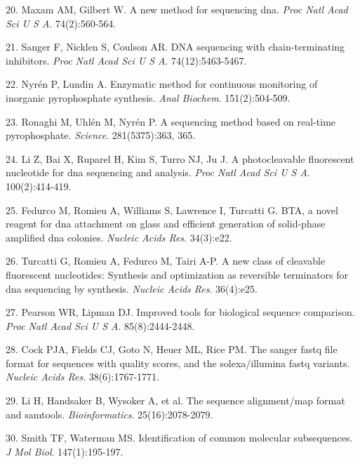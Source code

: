 \documentclass[11pt,letterpaper]{book}
\begin{document}
\leavevmode\hypertarget{ref-maxam:1977aa}{}%
20. Maxam AM, Gilbert W. A new method for sequencing dna. \emph{Proc Natl Acad Sci U S A}. 74(2):560-564.

\leavevmode\hypertarget{ref-sanger:1977aa}{}%
21. Sanger F, Nicklen S, Coulson AR. DNA sequencing with chain-terminating inhibitors. \emph{Proc Natl Acad Sci U S A}. 74(12):5463-5467.

\leavevmode\hypertarget{ref-nyren:1985aa}{}%
22. Nyrén P, Lundin A. Enzymatic method for continuous monitoring of inorganic pyrophosphate synthesis. \emph{Anal Biochem}. 151(2):504-509.

\leavevmode\hypertarget{ref-ronaghi:1998aa}{}%
23. Ronaghi M, Uhlén M, Nyrén P. A sequencing method based on real-time pyrophosphate. \emph{Science}. 281(5375):363, 365.

\leavevmode\hypertarget{ref-li:2003aa}{}%
24. Li Z, Bai X, Ruparel H, Kim S, Turro NJ, Ju J. A photocleavable fluorescent nucleotide for dna sequencing and analysis. \emph{Proc Natl Acad Sci U S A}. 100(2):414-419.

\leavevmode\hypertarget{ref-fedurco:2006aa}{}%
25. Fedurco M, Romieu A, Williams S, Lawrence I, Turcatti G. BTA, a novel reagent for dna attachment on glass and efficient generation of solid-phase amplified dna colonies. \emph{Nucleic Acids Res}. 34(3):e22.

\leavevmode\hypertarget{ref-turcatti:2008aa}{}%
26. Turcatti G, Romieu A, Fedurco M, Tairi A-P. A new class of cleavable fluorescent nucleotides: Synthesis and optimization as reversible terminators for dna sequencing by synthesis. \emph{Nucleic Acids Res}. 36(4):e25.

\leavevmode\hypertarget{ref-pearson:1988aa}{}%
27. Pearson WR, Lipman DJ. Improved tools for biological sequence comparison. \emph{Proc Natl Acad Sci U S A}. 85(8):2444-2448.

\leavevmode\hypertarget{ref-cock:2010aa}{}%
28. Cock PJA, Fields CJ, Goto N, Heuer ML, Rice PM. The sanger fastq file format for sequences with quality scores, and the solexa/illumina fastq variants. \emph{Nucleic Acids Res}. 38(6):1767-1771.

\leavevmode\hypertarget{ref-li:2009aa}{}%
29. Li H, Handsaker B, Wysoker A, et al. The sequence alignment/map format and samtools. \emph{Bioinformatics}. 25(16):2078-2079.

\leavevmode\hypertarget{ref-smith:1981aa}{}%
30. Smith TF, Waterman MS. Identification of common molecular subsequences. \emph{J Mol Biol}. 147(1):195-197.
\end{document}
